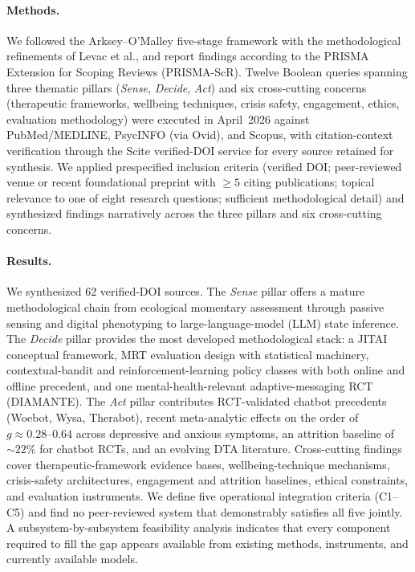 \documentclass[11pt,a4paper]{article}
\begin{document}
\paragraph{Methods.}
We followed the Arksey--O'Malley five-stage framework with the
methodological refinements of Levac et al., and report findings
according to the PRISMA Extension for Scoping Reviews (PRISMA-ScR).
Twelve Boolean queries spanning three thematic pillars
(\emph{Sense}, \emph{Decide}, \emph{Act}) and six cross-cutting concerns
(therapeutic frameworks, wellbeing techniques, crisis safety,
engagement, ethics, evaluation methodology) were executed in
April~2026 against PubMed/MEDLINE, PsycINFO (via Ovid), and Scopus,
with citation-context verification through the Scite verified-DOI
service for every source retained for synthesis. We applied
prespecified inclusion criteria (verified DOI; peer-reviewed venue
or recent foundational preprint with $\ge\!5$ citing publications;
topical relevance to one of eight research questions; sufficient
methodological detail) and synthesized findings narratively across
the three pillars and six cross-cutting concerns.

\paragraph{Results.}
We synthesized 62 verified-DOI sources. The \emph{Sense} pillar
offers a mature methodological chain from ecological momentary
assessment through passive sensing and digital phenotyping to
large-language-model (LLM) state inference. The \emph{Decide} pillar
provides the most developed methodological stack: a JITAI conceptual
framework, MRT evaluation design with statistical machinery,
contextual-bandit and reinforcement-learning policy classes with
both online and offline precedent, and one mental-health-relevant
adaptive-messaging RCT (DIAMANTE). The \emph{Act} pillar contributes
RCT-validated chatbot precedents (Woebot, Wysa, Therabot), recent
meta-analytic effects on the order of $g\!\approx\!0.28\text{--}0.64$
across depressive and anxious symptoms, an attrition baseline of
$\sim\!22\%$ for chatbot RCTs, and an evolving DTA literature.
Cross-cutting findings cover therapeutic-framework evidence bases,
wellbeing-technique mechanisms, crisis-safety architectures,
engagement and attrition baselines, ethical constraints, and
evaluation instruments. We define five operational integration
criteria (C1--C5) and find no peer-reviewed system that demonstrably
satisfies all five jointly. A subsystem-by-subsystem feasibility
analysis indicates that every component required to fill the gap
appears available from existing methods, instruments, and currently
available models.
\end{document}
